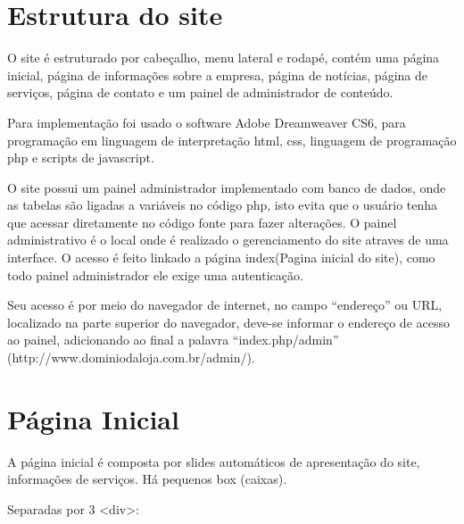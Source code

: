 \documentclass[
	12pt,				%
    oneside,			%
	a4paper,			%
	english,			%
	french,				%
	spanish,			%
	brazil,				%
	]{abntex2}
\begin{document}
\chapter{Estrutura do site}

O site é estruturado por cabeçalho, menu lateral e rodapé, contém uma página inicial, página de informações sobre a empresa, página de notícias, página de serviços, página de contato e um painel de administrador de conteúdo.

Para implementação foi usado o software Adobe Dreamweaver CS6, para programação em linguagem de interpretação html, css, linguagem de programação php e scripts de javascript. 

O site possui um painel administrador implementado com banco de dados, onde as tabelas são ligadas a variáveis no código php, isto evita que o usuário tenha que acessar diretamente no código fonte para fazer alterações. O painel administrativo é o local onde é realizado o gerenciamento do site atraves de uma interface. O acesso é feito linkado a página index(Pagina inicial do site), como todo painel administrador ele exige uma autenticação. 

Seu acesso é por meio do navegador de internet, no campo “endereço” ou URL, localizado na parte superior do navegador, deve-se informar o endereço de acesso ao painel, adicionando ao final a palavra “index.php/admin” \\(http://www.dominiodaloja.com.br/admin/).

\chapter{Página Inicial}

A página inicial é composta por slides automáticos de apresentação do site, informações de serviços. Há pequenos box (caixas).

Separadas por 3 <div>:
\end{document}
